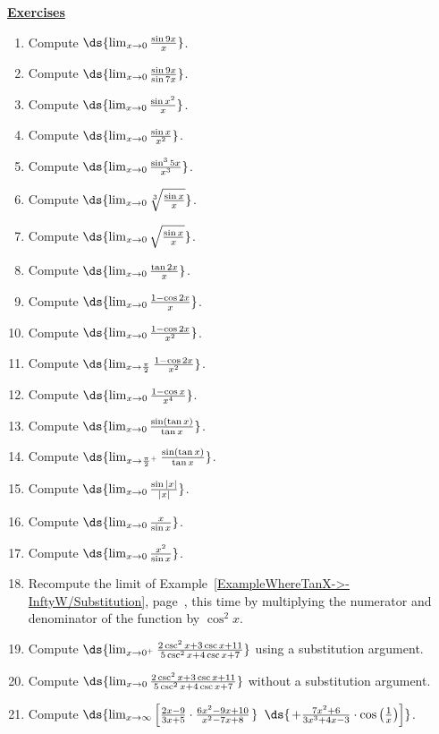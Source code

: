 \label{FunkyLimitWhereSubNoGood}
\eex
\newpage
\begin{center}
\underline{\Large{\bf Exercises}}\end{center}
\begin{multicols}{2}
\begin{enumerate}
\item Compute $\ds{\lim_{x\to0}\frac{\sin9x}{x}}$.
\item Compute $\ds{\lim_{x\to0}\frac{\sin9x}{\sin7x}}$.
\item Compute $\ds{\lim_{x\to0}\frac{\sin x^2}{x}}$.
\item Compute $\ds{\lim_{x\to0}\frac{\sin x}{x^2}}$.
\item Compute $\ds{\lim_{x\to0}\frac{\sin^35x}{x^3}}$.
\item Compute $\ds{\lim_{x\to0}\sqrt[3]{\frac{\sin x}{x}}}$.
\item Compute $\ds{\lim_{x\to0}\sqrt{\frac{\sin x}{x}}}$.
\item Compute $\ds{\lim_{x\to0}\frac{\tan 2x}{x}}$.
\item Compute $\ds{\lim_{x\to0}\frac{1-\cos2x}{x}}$.
\item Compute $\ds{\lim_{x\to0}\frac{1-\cos2x}{x^2}}$.
\item Compute $\ds{\lim_{x\to\frac{\pi}2}\frac{1-\cos2x}{x^2}}$.
\item Compute $\ds{\lim_{x\to0}\frac{1-\cos x}{x^4}}$.
\item Compute $\ds{\lim_{x\to0}\frac{\sin(\tan x)}{\tan x}}$.
\item Compute $\ds{\lim_{x\to{\frac{\pi}2}^+}\frac{\sin(\tan x)}{\tan x}}$.
\item Compute $\ds{\lim_{x\to0}\frac{\sin|x|}{|x|}}$.
\item Compute $\ds{\lim_{x\to0}\frac{x}{\sin x}}$.
\item Compute $\ds{\lim_{x\to0}\frac{x^2}{\sin x}}$.
\item Recompute the limit of 
Example~\ref{ExampleWhereTanX->-InftyW/Substitution},
page~\pageref{ExampleWhereTanX->-InftyW/Substitution},
this time by multiplying the numerator and denominator of the 
function by $\cos^2x$.
\item Compute 
$\ds{\lim_{x\to0^+}\frac{2\csc^2x+3\csc x+11}{5\csc^2x+4\csc x+7}}$
using a substitution argument.
\item Compute 
$\ds{\lim_{x\to0}\frac{2\csc^2x+3\csc x+11}{5\csc^2x+4\csc x+7}}$
without a substitution argument.
\item Compute $\ds{\lim_{x\to\infty}
  \left[\frac{2x-9}{3x+5}\cdot\frac{6x^2-9x+10}{x^2-7x+8}
          \right.}$
$\ds{\left.+\frac{7x^2+6}{3x^3+4x-3}\cdot\cos\left(\frac1x\right)\right]}$.

\end{enumerate}
\end{multicols}







